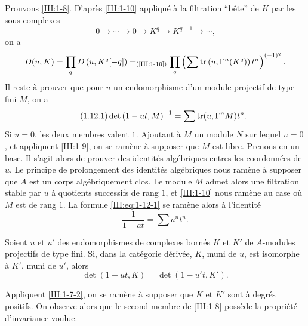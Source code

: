 \subsection{}\label{III:1-12}

Prouvons \ref{III:1-8}. D'après \ref{III:1-10} appliqué à la filtration 
``bête'' de $K$ par les sous-complexes 
\[
  0 \to \cdots \to 0 \to K^q \to K^{q+1} \to \cdots \text{,}
\]
on a 
\[
  D(u,K) = \prod_q D\left(u,K^q[-q]\right) =_{\text{(\ref{III:1-10})}} \prod_q \left(\sum \operatorname{tr}\left(u,\Gamma^n(K^q)\right) t^n \right)^{(-1)^q} \text{.}
\]
Il reste à prouver que pour $u$ un endomorphisme d'un module projectif de type 
fini $M$, on a 
\begin{equation*}\tag{1.12.1}\label{III:eq:1-12-1}
  \det\left(1-u t,M\right)^{-1} = \sum \operatorname{tr}(u,\Gamma^n M) t^n \text{.}
\end{equation*}
Si $u=0$, les deux membres valent $1$. Ajoutant à $M$ un module $N$ sur lequel 
$u=0$, et appliquent \ref{III:1-9}, on se ramène à supposer que $M$ est libre. 
Prenons-en un base. Il s'agit alors de prouver des identités algébriques 
entres les coordonnées de $u$. Le principe de prolongement des identités 
algébriques nous ramène à supposer que $A$ est un corps algébriquement 
clos. Le module $M$ admet alors une filtration stable par $u$ à quotients 
successifs de rang $1$, et \ref{III:1-10} nous ramène au case où $M$ est de 
rang $1$. La formule \eqref{III:eq:1-12-1} se ramène alors à l'identité 
\[
  \frac{1}{1-a t} = \sum a^n t^n \text{.}
\]





\begin{corollary_}\label{III:1-13}
Soient $u$ et $u'$ des endomorphismes de complexes bornés $K$ et $K'$ de 
$A$-modules projectifs de type fini. Si, dans la catégorie dérivée, $K$, 
muni de $u$, est isomorphe à $K'$, muni de $u'$, alors 
\[
  \det(1-u t,K) = \det(1-u' t,K') \text{.}
\]
\end{corollary_}

Appliquent \ref{III:1-7-2}, on se ramène à supposer que $K$ et $K'$ sont à 
degrés positifs. On observe alors que le second membre de \ref{III:1-8} 
possède la propriété d'invariance voulue. 





\subsection{}\label{III:1-14}

